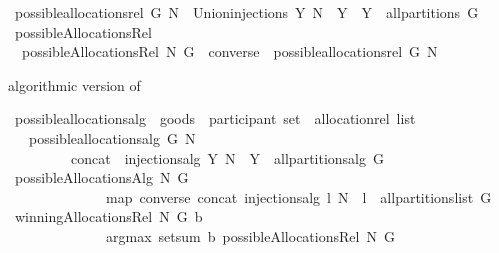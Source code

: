\begin{isabellebody}
\isamarkupfalse%
\ {\isachardoublequoteopen}possible{\isacharunderscore}allocations{\isacharunderscore}rel{\isacharprime}\ G\ N\ {\isacharequal}{\isacharequal}\ Union{\isacharbraceleft}injections{\isacharprime}\ Y\ N\ {\isacharbar}\ Y\ {\isachardot}\ Y\ {\isasymin}\ all{\isacharunderscore}partitions{\isacharprime}\ G{\isacharbraceright}{\isachardoublequoteclose}\isanewline
{}\isamarkupfalse%
\ possibleAllocationsRel\ \ \isanewline
\ \ {\isachardoublequoteopen}possibleAllocationsRel\ N\ G\ {\isacharequal}{\isacharequal}\ converse\ {\isacharbackquote}\ {\isacharparenleft}possible{\isacharunderscore}allocations{\isacharunderscore}rel\ G\ N{\isacharparenright}{\isachardoublequoteclose}%
\begin{isamarkuptext}%
algorithmic version of %
\end{isamarkuptext}%
\isamarkuptrue%
\isamarkupfalse%
\ possible{\isacharunderscore}allocations{\isacharunderscore}alg\ {\isacharcolon}{\isacharcolon}\ {\isachardoublequoteopen}goods\ {\isasymRightarrow}\ participant\ set\ {\isasymRightarrow}\ allocation{\isacharunderscore}rel\ list{\isachardoublequoteclose}\isanewline
\ \ \ {\isachardoublequoteopen}possible{\isacharunderscore}allocations{\isacharunderscore}alg\ G\ N\ {\isacharequal}\ \isanewline
\ \ \ \ \ \ \ \ \ concat\ {\isacharbrackleft}\ injections{\isacharunderscore}alg\ Y\ N\ {\isachardot}\ Y\ {\isasymleftarrow}\ all{\isacharunderscore}partitions{\isacharunderscore}alg\ G\ {\isacharbrackright}{\isachardoublequoteclose}\isanewline
\isanewline
{}\isamarkupfalse%
\ {\isachardoublequoteopen}possibleAllocationsAlg\ N\ G\ {\isacharequal}{\isacharequal}\ \isanewline
\ \ \ \ \ \ \ \ \ \ \ \ \ \ map\ converse\ {\isacharparenleft}concat\ {\isacharbrackleft}{\isacharparenleft}injections{\isacharunderscore}alg\ l\ N{\isacharparenright}\ {\isachardot}\ l\ {\isasymleftarrow}\ all{\isacharunderscore}partitions{\isacharunderscore}list\ G{\isacharbrackright}{\isacharparenright}{\isachardoublequoteclose}%
\isamarkuptrue%
\isamarkupfalse%
\ {\isachardoublequoteopen}winningAllocationsRel\ N\ G\ b\ {\isacharequal}{\isacharequal}\ \isanewline
\ \ \ \ \ \ \ \ \ \ \ \ \ \ argmax\ {\isacharparenleft}setsum\ b{\isacharparenright}\ {\isacharparenleft}possibleAllocationsRel\ N\ G{\isacharparenright}{\isachardoublequoteclose}\isanewline
\isanewline
\isanewline
{}\isamarkupfalse%

\end{isabellebody}
